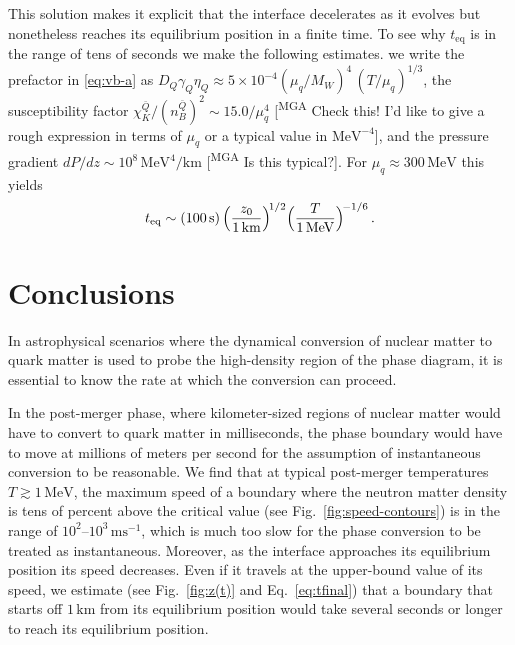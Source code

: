 \documentclass[10pt,superscriptaddress,
amsmath,aps,prl,twocolumn,nofootinbib]{revtex4-1}
\newcommand{\mga}[1]{{\color[rgb]{0.8,0,0}#1}}
\newcommand{\mgacom}[1]{\textsf{\color[rgb]{0.6,0,0}[\textsuperscript{MGA} #1]}}
\newcommand{\ga}{\gamma}
\newcommand{\m}{\text{m}}
\newcommand{\km}{\text{km}}
\newcommand{\s}{\text{s}}
\newcommand{\MeV}{\text{MeV}}
\newcommand{\Nbar}{{\ensuremath{\bar N}}}
\newcommand{\Qbar}{{\ensuremath{\bar Q}}}
\newcommand{\tfinal}{\ensuremath{t_\text{eq}}}
\begin{document}
This solution makes it explicit that the interface decelerates as it evolves but nonetheless reaches its equilibrium position in a finite time.
To see why $\tfinal$ is in the range of tens of seconds we make the following estimates. \mga{we write the prefactor in \eqref{eq:vb-a} as
$D_Q\ga_Q\eta_Q \approx 5{\times}10^{-4} (\mu_q/M_W)^4\,(T/\mu_q)^{1/3}$, the susceptibility factor $\chi_K^\Qbar/(n_B^\Qbar)^2 \sim 15.0/\mu_q^4$ \mgacom{Check this! I'd like to give a rough expression in terms of $\mu_q$ or a typical value in $\MeV^{-4}$}, and the pressure gradient
$dP/dz\sim 10^8\,\MeV^4/\km$ \mgacom{Is this typical?}.
For $\mu_q\approx 300\,\MeV$ this yields
\begin{equation}
    \tfinal \sim (100\,\s)\, \Bigl(\dfrac{z_0}{1\,\km}\Bigr)^{\!1/2}
    \Bigl(\dfrac{T}{1\,\MeV}\Bigr)^{\!-1/6} \, .
    \label{eq:tfinal}
\end{equation}
}



\section{Conclusions}

In astrophysical scenarios where the dynamical conversion of nuclear matter to quark matter is used to probe the high-density region of the phase diagram, it is essential to know the rate at which the conversion can proceed. 

In the post-merger phase, where kilometer-sized regions of nuclear matter would have to convert to quark matter in milliseconds, the phase boundary would have to move at millions of meters per second for the assumption of instantaneous conversion to be reasonable.  We find that at typical post-merger temperatures $T\gtrsim 1\,\MeV$, the maximum speed of a boundary where the neutron matter
density is tens of percent above the critical value (see Fig.~\ref{fig:speed-contours}) is in the range
of $10^2$--$10^3\,\m\s^{-1}$, which is much too slow for the phase conversion to be treated as instantaneous.
Moreover, as the interface approaches its equilibrium position its speed decreases. Even if it travels at the upper-bound value of its speed, we estimate (see Fig.~\ref{fig:z(t)} and Eq.~\eqref{eq:tfinal}) that a boundary that starts off $1\,\km$ from its equilibrium position would take several seconds or longer to reach its equilibrium position.
\end{document}
